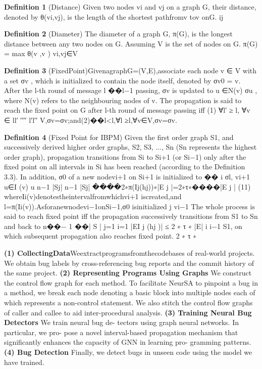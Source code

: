 \documentclass{article}
\begin{document}
\textbf{Definition 1} (Distance) Given two nodes vi and vj on a graph
G, their distance, denoted by θ(vi,vj), is the length of the shortest
pathfromv tov onG. ij


\textbf{Definition 2} (Diameter) The diameter of a graph G, π(G), is the longest distance between any two nodes on G. Assuming V is the set of nodes on G.
π(G) = max θ(v ,v ) vi,vj∈V 

\textbf{Definition 3} (FixedPoint)GivenagraphG=(V,E),associate
each node v ∈ V with a set σv , which is initialized to contain the
node itself, denoted by σv0 = {v}. After the l-th round of message l ��l−1
passing, σv is updated to u ∈N(v) σu , where N(v) refers to the
neighbouring nodes of v. The propagation is said to reach the fixed
point on G after l-th round of message passing iff (1) ∀l′ ≥ l, ∀v ∈ ll′ ′′′′ l′l′′
V,σv=σv;and(2)��l<l,∀l ≥l,∀v∈V,σv=σv.

\textbf{Definition 4}  (Fixed Point for IBPM) Given the first order graph
S1, and successively derived higher order graphs, S2, S3, ..., Sn
(Sn represents the highest order graph), propagation transitions
from Si to Si+1 (or Si−1) only after the fixed point on all intervals
in Si has been reached (according to the Definition 3.3). In addition,
σ0 of a new nodevi+1 on Si+1 is initialized to �� i σl, vi+1 u∈I (v) u
n−1 |Sj| n−1 |Sj| ����2∗π(Ij(hj))∗|E j |=2∗τ∗����|E j | (11)
whereIi(v)denotestheintervalfromwhichvi+1 iscreated,and l=π(Ii(v)).Asforanewnodevi−1onSi−1,σ0 isinitialized
j
vi−1
 The whole process is said to reach fixed point iff the propagation successively transitions from S1 to Sn and back to
n��− 1 ��| S | j=1 i=1
|EI j (hj )| ≤ 2 ∗ τ ∗ |E| i
i−1
S1, on which subsequent propagation also reaches fixed point.
2 ∗ τ ∗

\textbf{(1) CollectingData}Weextractprogramsfromthecodebases
of real-world projects. We obtain bug labels by cross-referencing bug reports and the commit history of the same project.
\textbf{(2) Representing Programs Using Graphs} We construct the control flow graph for each method. To facilitate NeurSA to pinpoint a bug in a method, we break each node denoting a basic block into multiple nodes each of which represents a non-control statement. We also stitch the control flow graphs of caller and callee to aid inter-procedural analysis.
\textbf{(3) Training Neural Bug Detectors} We train neural bug de- tectors using graph neural networks. In particular, we pro- pose a novel interval-based propagation mechanism that significantly enhances the capacity of GNN in learning pro- gramming patterns.
\textbf{(4) Bug Detection} Finally, we detect bugs in unseen code using the model we have trained.
\end{document}
